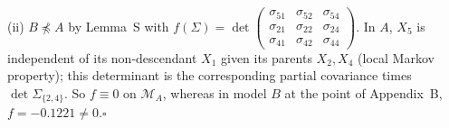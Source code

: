\documentclass[10pt,a4paper]{article}
\newcommand{\nnest}{\not\preceq}
\begin{document}
\noindent(ii) $B\nnest A$ by Lemma~S with $f(\Sigma)=\det\!\begin{pmatrix}\sigma_{51} & \sigma_{52} & \sigma_{54} \\ \sigma_{21} & \sigma_{22} & \sigma_{24} \\ \sigma_{41} & \sigma_{42} & \sigma_{44}\end{pmatrix}$. In $A$, $X_5$ is independent of its non-descendant $X_1$ given its parents $X_2,X_4$ (local Markov property); this determinant is the corresponding partial covariance times $\det\Sigma_{\{2,4\}}$. So $f\equiv0$ on $\mathcal M_A$, whereas in model $B$ at the point of Appendix~B, $f=-0.1221\neq0$.\hfill$\square$\par\medskip
{}

\clearpage
\end{document}
